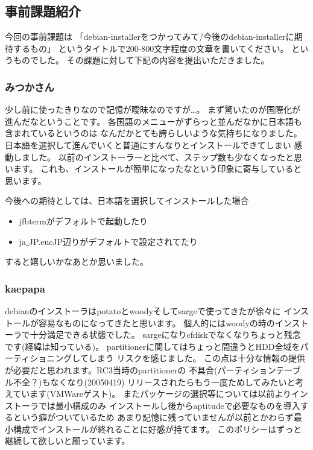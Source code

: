 \documentclass[mingoth]{jsarticle}
\begin{document}
\subsection{事前課題紹介}

今回の事前課題は
「debian-installerをつかってみて/今後のdebian-installerに期待するもの」
というタイトルで200-800文字程度の文章を書いてください。
というものでした。
その課題に対して下記の内容を提出いただきました。

\subsubsection{みつかさん}

少し前に使ったきりなので記憶が曖昧なのですが…。
まず驚いたのが国際化が進んだなということです。
各国語のメニューがずらっと並んだなかに日本語も含まれているというのは
なんだかとても誇らしいような気持ちになりました。
日本語を選択して進んでいくと普通にすんなりとインストールできてしまい
感動しました。
以前のインストーラーと比べて、ステップ数も少なくなったと思います。
これも、インストールが簡単になったなという印象に寄与していると思います。

今後への期待としては、日本語を選択してインストールした場合

\begin{itemize}
 \item jfbtermがデフォルトで起動したり
 \item ja\underline{ }JP.eucJP辺りがデフォルトで設定されてたり
\end{itemize}


すると嬉しいかなあとか思いました。


\subsubsection{kaepapa}

debianのインストーラはpotatoとwoodyそしてsargeで使ってきたが徐々に
インストールが容易なものになってきたと思います。
個人的にはwoodyの時のインストーラで十分満足できる状態でした。
sargeになりcfdiskでなくなりちょっと残念です(経緯は知っている)。
partitionerに関してはちょっと間違うとHDD全域をパーティショニングしてしまう
リスクを感じました。
この点は十分な情報の提供が必要だと思われます。RC3当時のpartitionerの
不具合(パーティションテーブル不全？)もなくなり(20050419)
リリースされたらもう一度ためしてみたいと考えています(VMWareゲスト)。
またパッケージの選択等については以前よりインストーラでは最小構成のみ
インストールし後からaptitudeで必要なものを導入するという癖がついているため
あまり記憶に残っていませんが以前とかわらず最小構成でインストールが終れることに好感が持てます。
このポリシーはずっと継続して欲しいと願っています。
\end{document}

